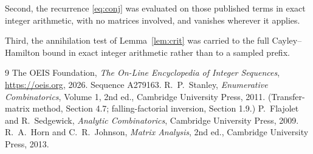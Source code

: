 \documentclass[11pt,a4paper]{article}
\theoremstyle{plain}
\theoremstyle{definition}
\begin{document}
Second, the recurrence \eqref{eq:conj} was evaluated on those published terms in exact
integer arithmetic, with no matrices involved, and vanishes wherever it applies.

Third, the annihilation test of Lemma~\ref{lem:crit} was carried to the full
Cayley--Hamilton bound in exact integer arithmetic rather than to a sampled prefix.

\begin{thebibliography}{9}
 The OEIS Foundation, \emph{The On-Line Encyclopedia of Integer
Sequences}, \url{https://oeis.org}, 2026. Sequence A279163.
 R.~P.~Stanley, \emph{Enumerative Combinatorics}, Volume 1, 2nd ed.,
Cambridge University Press, 2011. (Transfer-matrix method, Section 4.7; falling-factorial
inversion, Section 1.9.)
 P.~Flajolet and R.~Sedgewick, \emph{Analytic Combinatorics}, Cambridge
University Press, 2009.
 R.~A.~Horn and C.~R.~Johnson, \emph{Matrix Analysis}, 2nd ed., Cambridge
University Press, 2013.
\end{thebibliography}
\end{document}
